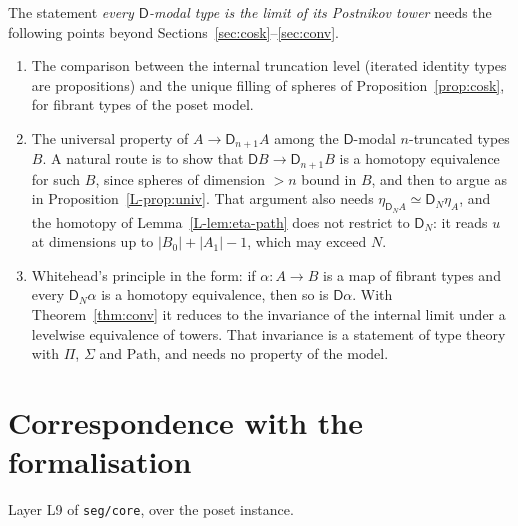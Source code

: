\documentclass[11pt]{article}
\newcommand{\Path}{\mathrm{Path}}
\newcommand{\D}{\mathsf{D}}
\theoremstyle{plain}
\theoremstyle{definition}
\theoremstyle{remark}
\begin{document}
The statement \emph{every $\D$-modal type is the limit of its Postnikov
tower} needs the following points beyond Sections~\ref{sec:cosk}--\ref{sec:conv}.
\begin{enumerate}
\item The comparison between the internal truncation level (iterated
  identity types are propositions) and the unique filling of spheres of
  Proposition~\ref{prop:cosk}, for fibrant types of the poset model.
\item The universal property of $A\to\D_{n+1}A$ among the $\D$-modal
  $n$-truncated types $B$. A natural route is to show that $\D B\to\D_{n+1}B$ is a
  homotopy equivalence for such $B$, since spheres of dimension $>n$ bound
  in $B$, and then to argue as in Proposition~\ref{L-prop:univ}. That
  argument also needs $\eta_{\D_NA}\simeq\D_N\eta_A$, and the homotopy of
  Lemma~\ref{L-lem:eta-path} does not restrict to $\D_N$: it reads $u$ at
  dimensions up to $|B_0|+|A_1|-1$, which may exceed $N$.
\item Whitehead's principle in the form: if $\alpha:A\to B$ is a map of
  fibrant types and every $\D_N\alpha$ is a homotopy equivalence, then so is
  $\D\alpha$. With Theorem~\ref{thm:conv} it reduces to the invariance of the
  internal limit under a levelwise equivalence of towers. That invariance
  is a statement of type theory with $\Pi$, $\Sigma$ and $\Path$, and needs
  no property of the model.
\end{enumerate}

\appendix
\section{Correspondence with the formalisation}

\noindent Layer L9 of \texttt{seg/core}, over the poset instance.
\end{document}
